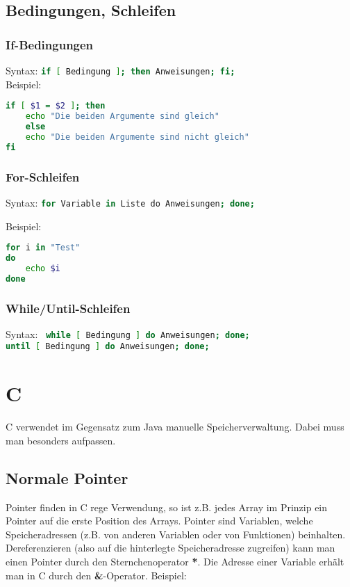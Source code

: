 \documentclass[11pt]{scrartcl}
\begin{document}
\subsection{Bedingungen, Schleifen}

\subsubsection{If-Bedingungen}
Syntax: \lstinline[language=Bash]!if [ Bedingung ]; then Anweisungen; fi;! \\
Beispiel:\\

\begin{lstlisting}[language=Bash]
if [ $1 = $2 ]; then
	echo "Die beiden Argumente sind gleich"
    else
	echo "Die beiden Argumente sind nicht gleich"
fi
\end{lstlisting}

\subsubsection{For-Schleifen}
Syntax: \lstinline[language=Bash]!for Variable in Liste do Anweisungen; done;!

Beispiel:\\
\begin{lstlisting}[language=Bash]
for i in "Test"
do
	echo $i
done
\end{lstlisting}

\subsubsection{While/Until-Schleifen}
Syntax: \lstinline[language=Bash]! while [ Bedingung ] do Anweisungen; done;!\\
\lstinline[language=Bash]!until [ Bedingung ] do Anweisungen; done;!\\

\section{C}
C verwendet im Gegensatz zum Java manuelle Speicherverwaltung. Dabei muss man besonders aufpassen. %

\subsection{Normale Pointer} %
Pointer finden in C rege Verwendung, so ist z.B. jedes Array im Prinzip ein Pointer auf die erste Position des Arrays. Pointer sind Variablen, welche Speicheradressen (z.B. von anderen Variablen oder von Funktionen) beinhalten.
Dereferenzieren (also auf die hinterlegte Speicheradresse zugreifen) kann man einen Pointer durch den Sternchenoperator \textbf{*}. Die Adresse einer Variable erhält man in C durch den \textbf{\&}-Operator. Beispiel:\\
\end{document}
